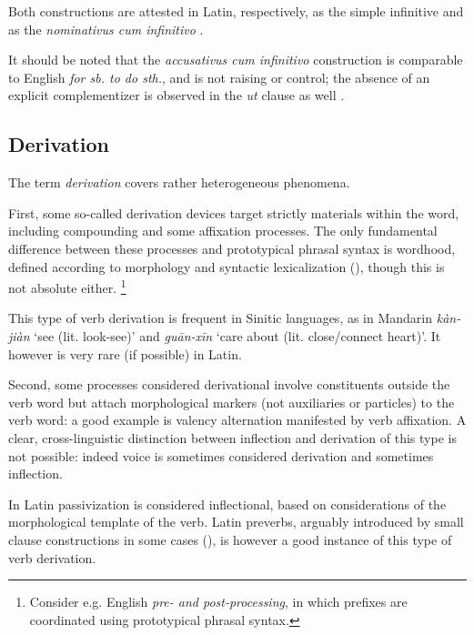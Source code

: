 \documentclass[a4paper, oneside, 12pt]{report}
\newcommand*{\citepages}[1]{pp.~{#1}}
\newcommand*{\term}[1]{\emph{#1}}
\newcommand{\form}[1]{\emph{#1}}
\newcommand{\translate}[1]{`#1'}
\begin{document}
Both constructions are attested in Latin, respectively,
as the simple infinitive \citep[\citepages{295-298}]{oniga2014latin}
and as the \form{nominativus cum infinitivo} \citep[\citepages{298-301}]{oniga2014latin}.

It should be noted that the \form{accusativus cum infinitivo} construction 
is comparable to English \form{for sb. to do sth.},
and is not raising or control;
the absence of an explicit complementizer is observed in the \form{ut} clause as well
\citep[\citepages{290-292}]{oniga2014latin}.

\subsection{Derivation}

The term \term{derivation} covers rather heterogeneous phenomena.

First, some so-called derivation devices target strictly materials within the word,
including compounding \citep{di2005decomposing,scher2014unifying,siddiqi2009syntax} and some affixation processes.
The only fundamental difference between these processes and prototypical phrasal syntax is wordhood, defined according to morphology and syntactic lexicalization (),
though this is not absolute either.%
\footnote{
    Consider e.g. English \form{pre- and post-processing}, in which prefixes are coordinated using prototypical phrasal syntax.
}

This type of verb derivation is frequent in Sinitic languages,
as in Mandarin \form{kàn-jiàn} \translate{see (lit. look-see)}
and \form{guān-xīn} \translate{care about (lit. close/connect heart)}.
It however is very rare (if possible) in Latin.

Second, some processes considered derivational involve constituents outside the verb word
but attach morphological markers (not auxiliaries or particles) to the verb word:
a good example is valency alternation manifested by verb affixation.
A clear, cross-linguistic distinction between inflection and derivation of this type is not possible:
indeed voice is sometimes considered derivation \citep{jacques2021grammar} and sometimes inflection.

In Latin passivization is considered inflectional, based on considerations of the morphological template of the verb.
Latin preverbs, arguably introduced by small clause constructions in some cases (),
is however a good instance of this type of verb derivation.
\end{document}
